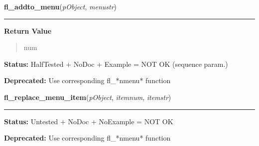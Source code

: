     \label{xformslib:deprecated:fl_addto_menu}

    \vspace{0.5ex}

\hspace{.8\funcindent}\begin{boxedminipage}{\funcwidth}

    \raggedright \textbf{fl\_addto\_menu}(\textit{pObject}, \textit{menustr})

    \vspace{-1.5ex}

    \rule{\textwidth}{0.5\fboxrule}
\setlength{\parskip}{2ex}
\setlength{\parskip}{1ex}
      \textbf{Return Value}
    \vspace{-1ex}

      \begin{quote}
      num

      \end{quote}

\textbf{Status:} HalfTested + NoDoc + Example = NOT OK (sequence param.)



\textbf{Deprecated:} Use corresponding fl\_*nmenu* function



    \end{boxedminipage}

    \label{xformslib:deprecated:fl_replace_menu_item}

    \vspace{0.5ex}

\hspace{.8\funcindent}\begin{boxedminipage}{\funcwidth}

    \raggedright \textbf{fl\_replace\_menu\_item}(\textit{pObject}, \textit{itemnum}, \textit{itemstr})

    \vspace{-1.5ex}

    \rule{\textwidth}{0.5\fboxrule}
\setlength{\parskip}{2ex}
\setlength{\parskip}{1ex}
\textbf{Status:} Untested + NoDoc + NoExample = NOT OK



\textbf{Deprecated:} Use corresponding fl\_*nmenu* function



    \end{boxedminipage}

